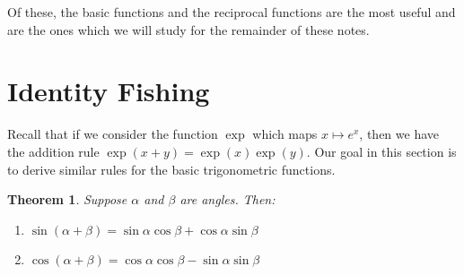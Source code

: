 \documentclass[a4paper,leqno]{article}
\newcommand{\marginsymbol}{\marginpar{\hfill(\ding{43})}}
\numberwithin{equation}{section}
\newtheorem{thm}[equation]{Theorem}
\theoremstyle{definition}
\theoremstyle{remark}
\begin{document}
Of these, the basic functions and the reciprocal functions are the most useful and are
the ones which we will study for the remainder of these notes.

\section{Identity Fishing}
Recall that if we consider the function $ \exp $ which maps $ x \mapsto e^x $, then we have the addition rule $ \exp(x + y) = \exp(x) \exp(y) $. Our
goal in this section is to derive similar rules for the basic trigonometric functions.

\begin{thm}\leavevmode\label{thm:sumids}\marginsymbol
  Suppose $ \alpha $ and $ \beta $ are angles. Then:
  \begin{enumerate}
    \item $ \sin(\alpha + \beta) = \sin \alpha \cos \beta + \cos \alpha \sin \beta $
    \item $ \cos(\alpha + \beta) = \cos \alpha \cos \beta - \sin \alpha \sin \beta $
  \end{enumerate}
\end{thm}
%
\end{document}
